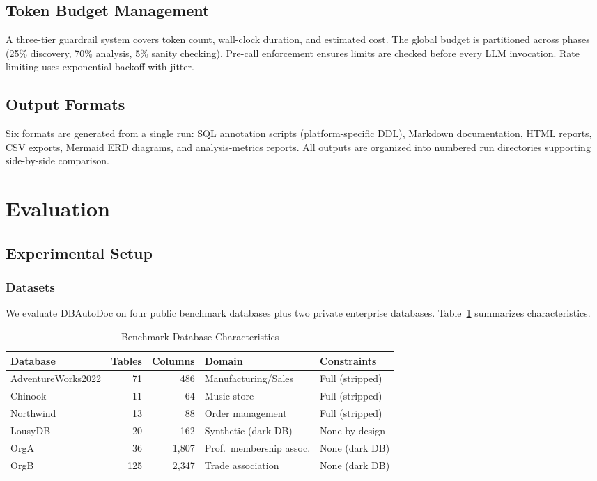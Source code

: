 \documentclass[sigconf, nonacm]{acmart}
\begin{document}
\subsection{Token Budget Management}

A three-tier guardrail system covers token count, wall-clock duration, and estimated cost. The global budget is partitioned across phases (25\% discovery, 70\% analysis, 5\% sanity checking). Pre-call enforcement ensures limits are checked before every LLM invocation. Rate limiting uses exponential backoff with jitter.

\subsection{Output Formats}

Six formats are generated from a single run: SQL annotation scripts (platform-specific DDL), Markdown documentation, HTML reports, CSV exports, Mermaid ERD diagrams, and analysis-metrics reports. All outputs are organized into numbered run directories supporting side-by-side comparison.


\section{Evaluation}\label{sec:evaluation}

\subsection{Experimental Setup}

\subsubsection{Datasets}

We evaluate DBAutoDoc on four public benchmark databases plus two private enterprise databases. Table~\ref{tab:benchmarks} summarizes characteristics.

\begin{table}[htbp]
\caption{Benchmark Database Characteristics}
\label{tab:benchmarks}
\centering
\begin{tabular}{lrrll}
\toprule
\textbf{Database} & \textbf{Tables} & \textbf{Columns} & \textbf{Domain} & \textbf{Constraints} \\
\midrule
AdventureWorks2022 & 71 & 486 & Manufacturing/Sales & Full (stripped) \\
Chinook & 11 & 64 & Music store & Full (stripped) \\
Northwind & 13 & 88 & Order management & Full (stripped) \\
LousyDB & 20 & 162 & Synthetic (dark DB) & None by design \\
OrgA & 36 & 1{,}807 & Prof.\ membership assoc. & None (dark DB) \\
OrgB & 125 & 2{,}347 & Trade association & None (dark DB) \\
\bottomrule
\end{tabular}
\end{table}
\end{document}
